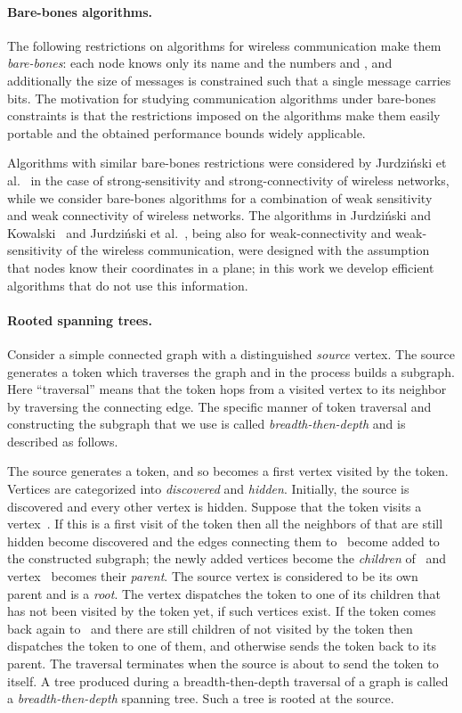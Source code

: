 \documentclass[11pt]{article}
\newcommand{\BBB}{\vspace*{-\bigskipamount}}
\newcommand{\Paragraph}[1]{\BBB\paragraph{#1}}
\begin{document}
\Paragraph{Bare-bones algorithms.}



The following restrictions on algorithms for wireless communication make them \emph{bare-bones}: each node knows only its name and the numbers  and , and additionally the size of messages is constrained such that a single message carries  bits.
The motivation for studying communication algorithms under bare-bones constraints is that the restrictions imposed on the algorithms make them easily portable and the obtained performance bounds widely applicable.

Algorithms with similar bare-bones restrictions were considered by Jurdzi{\'n}ski et al.~\cite{JurdzinskiKRS-PODC14}  in the case of strong-sensitivity and strong-connectivity of wireless networks, while we consider bare-bones algorithms for a combination of weak sensitivity and weak connectivity of wireless networks.
The algorithms in Jurdzi\'nski and Kowalski~\cite{JK-DISC12} and Jurdzi\'nski et al.~\cite{JKS-ICALP-13}, being also for weak-connectivity and weak-sensitivity of the wireless communication, were designed with the assumption that nodes know their coordinates in a plane; in this work we develop efficient algorithms that do not use this information.







\Paragraph{Rooted spanning trees.}



Consider a simple connected graph  with a distinguished \emph{source} vertex.
The source generates a token which traverses the graph and in the process builds a subgraph.
Here ``traversal'' means that the token hops from a visited vertex to its neighbor by traversing the connecting edge.
The specific manner of token traversal and constructing the subgraph that we use is called \emph{breadth-then-depth} and is described as follows.

The source generates a token, and so becomes a first vertex visited by the token.
Vertices are categorized into \emph{discovered} and \emph{hidden}.
Initially, the source is discovered and every other vertex is hidden.
Suppose that the token visits a vertex~.
If this is a first visit of the token then all the neighbors of  that are still hidden become discovered and the edges connecting them to~ become added to the constructed subgraph; the newly added vertices become the \emph{children} of~ and vertex~ becomes their \emph{parent}.
The source vertex is considered to be its own parent and is a \emph{root}.
The vertex  dispatches the token to one of its children that has not been visited by the token yet, if such vertices exist.
If the token comes back again to~ and there are still children of  not visited by the token then  dispatches the token to one of them, and otherwise sends the token back to its parent.
The traversal terminates when the source is about to send the token to itself. 
A tree produced during a breadth-then-depth traversal of a graph is called a \emph{breadth-then-depth} spanning tree.
Such a tree is rooted at the source.
\end{document}
